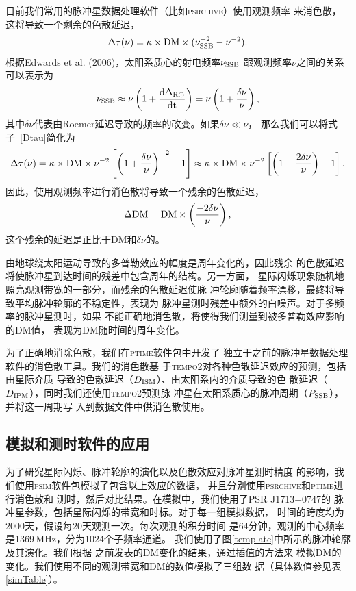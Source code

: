 目前我们常用的脉冲星数据处理软件（比如\textsc{psrchive}）使用观测频率
来消色散，这将导致一个剩余的色散延迟，
\begin{equation}
\Delta\tau(\nu)=\kappa\times \rm{DM}\times(\nu_{\rm{SSB}}^{-2}-\nu^{-2}).
\label{Dtau}
\end{equation}
根据Edwards et al. (2006)\supercite{Edwards06}，太阳系质心的射电频率$\nu_{\rm{SSB}}$
跟观测频率$\nu$之间的关系可以表示为
\begin{equation}
\nu_{\rm{SSB}}\approx\nu\left(1+\frac{\rm{d}\Delta_{\rm{R\odot}}}{\rm{d}t}\right)=\nu\left(1+\frac{\delta\nu}{\nu}\right),
\end{equation}
%
其中$\delta\nu$代表由Roemer延迟导致的频率的改变。如果$\delta\nu\ll\nu$，
那么我们可以将式子~\ref{Dtau}简化为
%
\begin{equation}
\Delta\tau(\nu)=\kappa\times \rm{DM}\times\nu^{-2}\left[\left(1+\frac{\delta\nu}{\nu}\right)^{-2}-1\right]\approx\kappa\times \rm{DM}\times\nu^{-2}\left[\left(1-\frac{2\delta\nu}{\nu}\right)-1\right].
\end{equation}
%
因此，使用观测频率进行消色散将导致一个残余的色散延迟，
\begin{equation}
\Delta \rm{DM}=\rm{DM}\times\left(\frac{-2\delta\nu}{\nu}\right),
\label{dDM}
\end{equation}
这个残余的延迟是正比于DM和$\delta\nu$的。

由地球绕太阳运动导致的多普勒效应的幅度是周年变化的，因此残余
的色散延迟将使脉冲星到达时间的残差中包含周年的结构。另一方面，
星际闪烁现象随机地照亮观测带宽的一部分，而残余的色散延迟使脉
冲轮廓随着频率漂移，最终将导致平均脉冲轮廓的不稳定性，表现为
脉冲星测时残差中额外的白噪声。对于多频率的脉冲星测时，如果
不能正确地消色散，将使得我们测量到被多普勒效应影响的DM值，
表现为DM随时间的周年变化。

为了正确地消除色散，我们在\textsc{ptime}软件包中开发了
独立于之前的脉冲星数据处理软件的消色散工具。我们的消色散基
于\textsc{tempo2}对各种色散延迟效应的预测，包括由星际介质
导致的色散延迟（$D_{\rm{ISM}}$）、由太阳系内的介质导致的色
散延迟（$D_{\rm{IPM}}$），同时我们还使用\textsc{tempo2}预测脉
冲星在太阳系质心的脉冲周期（$P_{\rm{SSB}}$），并将这一周期写
入到数据文件中供消色散使用。

\subsection{模拟和测时软件的应用}

为了研究星际闪烁、脉冲轮廓的演化以及色散效应对脉冲星测时精度
的影响，我们使用\textsc{psim}软件包模拟了包含以上效应的数据，
并且分别使用\textsc{psrchive}和\textsc{ptime}进行消色散和
测时，然后对比结果。在模拟中，我们使用了PSR J1713$+$0747的
脉冲星参数，包括星际闪烁的带宽和时标。对于每一组模拟数据，
时间的跨度均为2000天，假设每20天观测一次。每次观测的积分时间
是64分钟，观测的中心频率是1369\,MHz，分为1024个子频率通道。
我们使用了图\ref{template}中所示的脉冲轮廓及其演化。我们根据
之前发表的DM变化的结果\supercite{Keith13}，通过插值的方法来
模拟DM的变化。我们使用不同的观测带宽和DM的数值模拟了三组数
据（具体数值参见表\ref{simTable}）。

